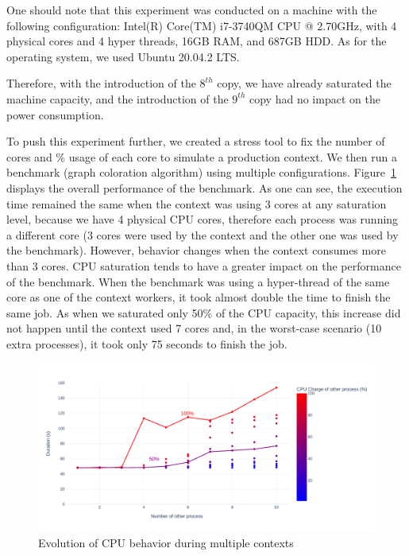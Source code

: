 One should note that this experiment was conducted on a machine with the following configuration: Intel(R) Core(TM) i7-3740QM CPU @ 2.70GHz, with 4 physical cores and 4 hyper threads, 16GB RAM, and 687GB HDD.
As for the operating system, we used Ubuntu 20.04.2 LTS. 

Therefore, with the introduction of the $8^{th}$ copy, we have already saturated the machine capacity, and the introduction of the $9^{th}$ copy had no impact on the power consumption.

To push this experiment further, we created a stress tool to fix the number of cores and \% usage of each core to simulate a production context. 
We then run a benchmark (graph coloration algorithm) using multiple configurations.
Figure~\ref{fig:green_faas_duration} displays the overall performance of the benchmark.
As one can see, the execution time remained the same when the context was using 3 cores at any saturation level, because we have 4 physical CPU cores, therefore each process was running a different core (3 cores were used by the context and the other one was used by the benchmark).
However, behavior changes when the context consumes more than 3 cores.
CPU saturation tends to have a greater impact on the performance of the benchmark.
When the benchmark was using a hyper-thread of the same core as one of the context workers, it took almost double the time to finish the same job.
As when we saturated only 50\% of the CPU capacity, this increase did not happen until the context used 7 cores and, in the worst-case scenario (10 extra processes), it took only 75 seconds to finish the job.

\begin{figure}[!h]
      \centering
      \includegraphics[width=\linewidth]{chapters/green_faas_duration}
      \caption{Evolution of CPU behavior during multiple contexts }
      \label{fig:green_faas_duration}
\end{figure}


